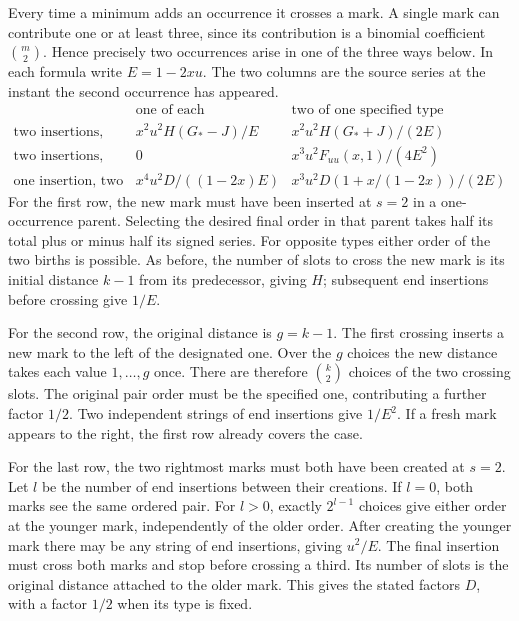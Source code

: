 \documentclass[11pt,letterpaper]{article}
\begin{document}
Every time a minimum adds an occurrence it crosses a mark. A single mark can contribute one or at least three, since its contribution is a binomial coefficient \(\binom m2\). Hence precisely two occurrences arise in one of the three ways below. In each formula write \(E=1-2xu\). The two columns are the source series at the instant the second occurrence has appeared.
\[
\begin{array}{c|cc}
 &\text{one of each}&\text{two of one specified type}\\ \hline
\text{two insertions, fresh mark}&x^2u^2H(G_*-J)/E&
                 x^2u^2H(G_*+J)/(2E)\\[2pt]
\text{two insertions, same mark}&0&x^3u^2 F_{uu}(x,1)/(4E^2)\\[2pt]
\text{one insertion, two marks}&x^4u^2D/((1-2x)E)&
              x^3u^2D(1+x/(1-2x))/(2E)
\end{array}
\]
For the first row, the new mark must have been inserted at \(s=2\) in a one-occurrence parent. Selecting the desired final order in that parent takes half its total plus or minus half its signed series. For opposite types either order of the two births is possible. As before, the number of slots to cross the new mark is its initial distance \(k-1\) from its predecessor, giving \(H\); subsequent end insertions before crossing give \(1/E\).

For the second row, the original distance is \(g=k-1\). The first crossing inserts a new mark to the left of the designated one. Over the \(g\) choices the new distance takes each value \(1,\ldots,g\) once. There are therefore \(\binom{k}{2}\) choices of the two crossing slots. The original pair order must be the specified one, contributing a further factor \(1/2\). Two independent strings of end insertions give \(1/E^2\). If a fresh mark appears to the right, the first row already covers the case.

For the last row, the two rightmost marks must both have been created at \(s=2\). Let \(l\) be the number of end insertions between their creations. If \(l=0\), both marks see the same ordered pair. For \(l>0\), exactly \(2^{l-1}\) choices give either order at the younger mark, independently of the older order. After creating the younger mark there may be any string of end insertions, giving \(u^2/E\). The final insertion must cross both marks and stop before crossing a third. Its number of slots is the original distance attached to the older mark. This gives the stated factors \(D\), with a factor \(1/2\) when its type is fixed.
\end{document}
